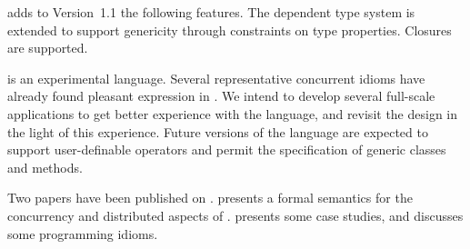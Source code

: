 {}\XtenCurrVer{} adds to Version~1.1 the following features. The
dependent type system is extended to support genericity through
constraints on type properties.  Closures are supported.

{}\Xten{} is an experimental language.  Several representative
concurrent idioms have already found pleasant expression in \Xten. We
intend to develop several full-scale applications to get better
experience with the language, and revisit the design in the light of
this experience. Future versions of the language are expected to
support user-definable operators and permit the specification of
generic classes and methods.

Two papers have been published on \Xten{}. \cite{X10-concur05}
presents a formal semantics for the concurrency and distributed
aspects of \Xten{}. \cite{xten} presents some case studies, and
discusses some \Xten{} programming idioms.
